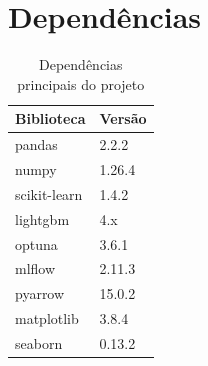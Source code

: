\documentclass[12pt, a4paper]{article}
\begin{document}
\appendix
\section{Depend\^encias}

\begin{table}[H]
\centering
\begin{tabular}{ll}
\toprule
\textbf{Biblioteca} & \textbf{Vers\~ao} \\
\midrule
pandas      & 2.2.2  \\
numpy       & 1.26.4 \\
scikit-learn & 1.4.2 \\
lightgbm    & 4.x    \\
optuna      & 3.6.1  \\
mlflow      & 2.11.3 \\
pyarrow     & 15.0.2 \\
matplotlib  & 3.8.4  \\
seaborn     & 0.13.2 \\
\bottomrule
\end{tabular}
\caption{Depend\^encias principais do projeto}
\end{table}
\end{document}
